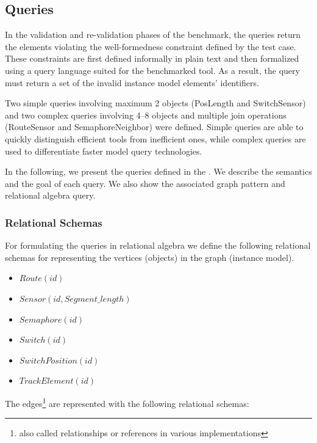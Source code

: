 \subsection{Queries}
\label{sec:queries}

In the validation and re-validation phases of the benchmark, the queries return the elements violating the well-formedness constraint defined by the test case. These constraints are first defined informally in plain text and then formalized using a query language suited for the benchmarked tool. As a result, the query must return a set of the invalid instance model elements' identifiers.
 
Two simple queries involving maximum 2 objects (\textsf{PosLength} and \textsf{SwitchSensor}) and two complex queries involving 4--8 objects and multiple join operations (\textsf{RouteSensor} and \textsf{SemaphoreNeighbor}) were defined. Simple queries are able to quickly distinguish efficient tools from inefficient ones, while complex queries are used to differentiate faster model query technologies.
 
In the following, we present the queries defined in the \tb{}. We describe the semantics and the goal of each query. We also show the associated graph pattern and relational algebra query.

\subsubsection{Relational Schemas}

For formulating the queries in relational algebra we define the following relational schemas for representing the vertices (objects) in the graph (instance model).

\begin{itemize}
  \item $ \mathit{Route}\left(\mathit{id}\right) $
  \item $ \mathit{Sensor}\left(\mathit{id}, \mathit{Segment\_length}\right) $
  \item $ \mathit{Semaphore}\left(\mathit{id}\right) $
  \item $ \mathit{Switch}\left(\mathit{id}\right) $
  \item $ \mathit{SwitchPosition}\left(\mathit{id}\right) $
  \item $ \mathit{TrackElement}\left(\mathit{id}\right) $
\end{itemize}

The edges\footnote{also called relationships or references in various implementations} are represented with the following relational schemas:

